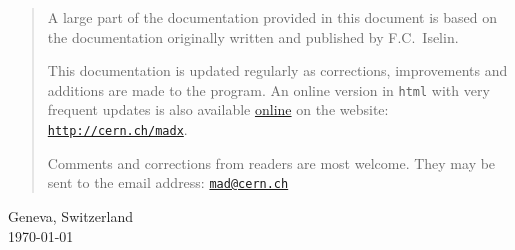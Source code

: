 \begin{titlepage}
\begin{quotation}
A large part of the
documentation provided in this document is based on the \madeight documentation 
originally written and published by F.C.~Iselin.  

This documentation is updated regularly as corrections, improvements
and additions are made to the program. An online version in {\tt html}
with very frequent updates is also available
\href{http://cern.ch/madx/madX/doc/usrguide/uguide.html}{online} on the
\madx website: \href{http://cern.ch/madx}{\tt http://cern.ch/madx}.

Comments and corrections from readers are most welcome. They may be sent to the
email address: \href{mailto:mad@cern.ch}{\tt mad@cern.ch}
\end{quotation}
\vfill

\begin{center}
Geneva, Switzerland \\
\today
\end{center}

\end{titlepage}



